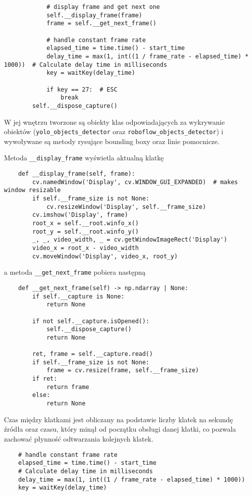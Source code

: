 \begin{verbatim}
			# display frame and get next one
			self.__display_frame(frame)
			frame = self.__get_next_frame()
			
			# handle constant frame rate
			elapsed_time = time.time() - start_time
			delay_time = max(1, int((1 / frame_rate - elapsed_time) * 1000))  # Calculate delay time in milliseconds
			key = waitKey(delay_time)
			
			if key == 27:  # ESC
				break
		self.__dispose_capture()
\end{verbatim}


W jej wnętrzu tworzone są obiekty klas odpowiadających za wykrywanie obiektów (\verb|yolo_objects_detector| oraz \verb|roboflow_objects_detector|) i wywoływane są metody rysujące bounding boxy oraz linie pomocnicze.

Metoda \verb|__display_frame| wyświetla aktualną klatkę

\begin{verbatim}
	def __display_frame(self, frame):
		cv.namedWindow('Display', cv.WINDOW_GUI_EXPANDED)  # makes window resizable
		if self.__frame_size is not None:
			cv.resizeWindow('Display', self.__frame_size)
		cv.imshow('Display', frame)
		root_x = self.__root.winfo_x()
		root_y = self.__root.winfo_y()
		_, _, video_width, _ = cv.getWindowImageRect('Display')
		video_x = root_x - video_width
		cv.moveWindow('Display', video_x, root_y)
\end{verbatim}

a metoda \verb|__get_next_frame| pobiera następną

\begin{verbatim}
	def __get_next_frame(self) -> np.ndarray | None:
		if self.__capture is None:
			return None
		
		if not self.__capture.isOpened():
			self.__dispose_capture()
			return None
		
		ret, frame = self.__capture.read()
		if self.__frame_size is not None:
			frame = cv.resize(frame, self.__frame_size)
		if ret:
			return frame
		else:
			return None
\end{verbatim}

Czas między klatkami jest obliczany na podstawie liczby klatek na sekundę źródła oraz czasu, który minął od początku obsługi danej klatki, co pozwala zachować płynność odtwarzania kolejnych klatek.

\begin{verbatim}
	# handle constant frame rate
	elapsed_time = time.time() - start_time
	# Calculate delay time in milliseconds
	delay_time = max(1, int((1 / frame_rate - elapsed_time) * 1000))
	key = waitKey(delay_time)
\end{verbatim}


